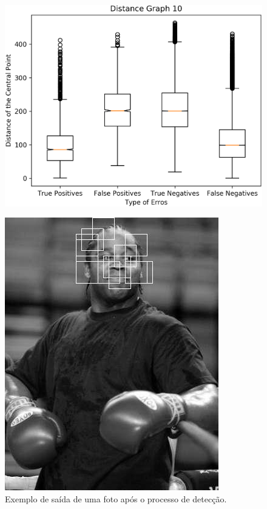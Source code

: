 \documentclass[aspectratio=169, xcolor=dvipsnames]{beamer}
\begin{document}
	\begin{frame}[plain]
		\begin{figure}[h]
			\centering
			\includegraphics[width=0.72\linewidth]{img/boxplot-10.png}
			\label{fig:bp-10}
		\end{figure}
	\end{frame}
	
	\begin{frame}
		\begin{figure}[h]
			\centering
			\includegraphics[width=0.9\linewidth]{img/detect.jpg}
			\caption{Exemplo de saída de uma foto após o processo de detecção.}
			\label{fig:detect_}
		\end{figure}
	\end{frame}
\end{document}
